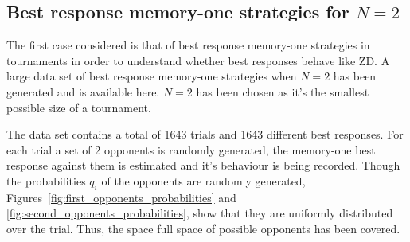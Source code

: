 \documentclass[10pt]{article}
\begin{document}
\subsection{Best response memory-one strategies for \(N=2\)}\label{subsection:best_response_n_2}

The first case considered is that of best response memory-one strategies in
tournaments in order to understand whether best responses behave like ZD. A
large data set of best response memory-one strategies when \(N=2\) has been
generated and is available here. \(N=2\) has been chosen as it's the smallest
possible size of a tournament.

The data set contains a total of 1643 trials and 1643 different best responses.
For each trial a set of 2 opponents is randomly generated, the memory-one best
response against them is estimated and it's behaviour is being recorded. Though
the probabilities \(q_i\) of the opponents are randomly generated,
Figures~\ref{fig:first_opponents_probabilities} and
\ref{fig:second_opponents_probabilities}, show that they are uniformly
distributed over the trial. Thus, the space full space of possible opponents has
been covered.
\end{document}
